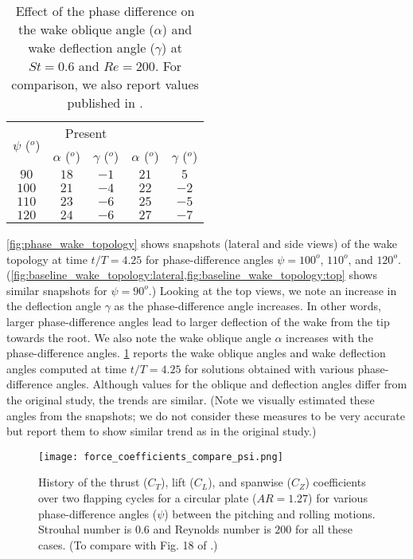 \begin{table}[!h]
  \centering
  \begin{tabular}{ccccc}
    \hline\hline
    \multirow{2}{*}{$\psi$ ($^o$)} &
      \multicolumn{2}{c}{Present} &
      \multicolumn{2}{c}{\citet{li_dong_2016}} \\
    & $\alpha$ ($^o$) & $\gamma$ ($^o$) & $\alpha$ ($^o$) & $\gamma$ ($^o$) \\
    \hline
    $90$ & $18$ & $-1$ & $21$ & $5$ \\
    $100$ & $21$ & $-4$ & $22$ & $-2$ \\
    $110$ & $23$ & $-6$ & $25$ & $-5$ \\
    $120$ & $24$ & $-6$ & $27$ & $-7$ \\
    \hline\hline
  \end{tabular}
  \caption{Effect of the phase difference on the wake oblique angle ($\alpha$) and wake deflection angle ($\gamma$) at $St = 0.6$ and $Re = 200$. For comparison, we also report values published in \citet{li_dong_2016}.}
  \label{tab:phase_angles}
\end{table}

\cref{fig:phase_wake_topology} shows snapshots (lateral and side views) of the wake topology at time $t/T = 4.25$ for phase-difference angles $\psi = 100^o$, $110^o$, and $120^o$.
(\cref{fig:baseline_wake_topology:lateral,fig:baseline_wake_topology:top} shows similar snapshots for $\psi = 90^o$.)
Looking at the top views, we note an increase in the deflection angle $\gamma$ as the phase-difference angle increases.
In other words, larger phase-difference angles lead to larger deflection of the wake from the tip towards the root.
We also note the wake oblique angle $\alpha$ increases with the phase-difference angles.
\cref{tab:phase_angles} reports the wake oblique angles and wake deflection angles computed at time $t/T = 4.25$ for solutions obtained with various phase-difference angles.
Although values for the oblique and deflection angles differ from the original study, the trends are similar.
(Note we visually estimated these angles from the snapshots; we do not consider these measures to be very accurate but report them to show similar trend as in the original study.)

\begin{figure}[!h]
  \centering
  \texttt{[image: force\_coefficients\_compare\_psi.png]}
  \caption{History of the thrust ($C_T$), lift ($C_L$), and spanwise ($C_Z$) coefficients over two flapping cycles for a circular plate ($AR = 1.27$) for various phase-difference angles ($\psi$) between the pitching and rolling motions. Strouhal number is $0.6$ and Reynolds number is $200$ for all these cases. (To compare with Fig. 18 of \citet{li_dong_2016}.)}
  \label{fig:phase_force_coefficients}
\end{figure}

